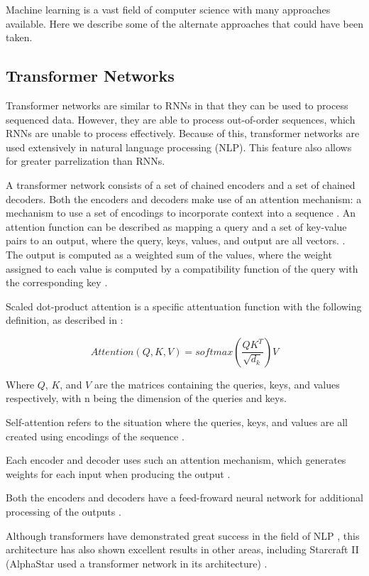 Machine learning is a vast field of computer science with many approaches available. Here we describe some of the alternate approaches that could have been taken.

\subsection{Transformer Networks}

Transformer networks are similar to RNNs in that they can be used to process sequenced data. However, they are able to process out-of-order sequences, which RNNs are unable to process effectively. Because of this, transformer networks are used extensively in natural language processing (NLP). This feature also allows for greater parrelization than RNNs.

A transformer network consists of a set of chained encoders and a set of chained decoders. Both the encoders and decoders make use of an attention mechanism: a mechanism to use a set of encodings to incorporate context into a sequence \cite{illustratedtransformer}. An attention function can be described as mapping a query and a set of key-value pairs to an output, where the query, keys, values, and output are all vectors. \cite{attention}. The output is computed as a weighted sum of the values, where the weight assigned to each value is computed by a compatibility function of the query with the corresponding key \cite{attention}.

Scaled dot-product attention is a specific attentuation function with the following definition, as described in \cite{attention}:

\[
Attention(Q,K,V)=softmax(\frac{QK^T}{\sqrt{d_k}})V
\]

Where $Q$, $K$, and $V$ are the matrices containing the queries, keys, and values respectively, with n being the dimension of the queries and keys.

Self-attention refers to the situation where the queries, keys, and values are all created using encodings of the sequence \cite{illustratedtransformer}.


Each encoder and decoder uses such an attention mechanism, which generates weights for each input when producing the output \cite{illustratedtransformer}.

Both the encoders and decoders have a feed-froward neural network for additional processing of the outputs \cite{illustratedtransformer}.

Although transformers have demonstrated great success in the field of NLP \cite{attention}, this architecture has also shown excellent results in other areas, including Starcraft II (AlphaStar used a transformer network in its architecture) \cite{alphastar}.

